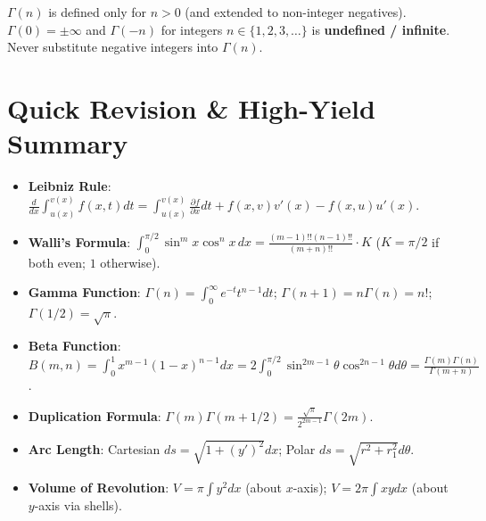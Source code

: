 \begin{commonmistake}
$\Gamma(n)$ is defined only for $n > 0$ (and extended to non-integer negatives). $\Gamma(0) = \pm\infty$ and $\Gamma(-n)$ for integers $n \in \{1, 2, 3, \dots\}$ is \textbf{undefined / infinite}. Never substitute negative integers into $\Gamma(n)$.
\end{commonmistake}

\section{Quick Revision \& High-Yield Summary}

\begin{quickrevision}
\begin{itemize}
    \item \textbf{Leibniz Rule}: $\frac{d}{dx}\int_{u(x)}^{v(x)} f(x,t)dt = \int_{u(x)}^{v(x)} \frac{\partial f}{\partial x}dt + f(x,v)v'(x) - f(x,u)u'(x)$.
    \item \textbf{Walli's Formula}: $\int_0^{\pi/2} \sin^m x \cos^n x\,dx = \frac{(m-1)!!(n-1)!!}{(m+n)!!} \cdot K$ ($K=\pi/2$ if both even; $1$ otherwise).
    \item \textbf{Gamma Function}: $\Gamma(n) = \int_0^\infty e^{-t} t^{n-1} dt$; $\Gamma(n+1)=n\Gamma(n)=n!$; $\Gamma(1/2)=\sqrt{\pi}$.
    \item \textbf{Beta Function}: $B(m,n) = \int_0^1 x^{m-1}(1-x)^{n-1}dx = 2\int_0^{\pi/2}\sin^{2m-1}\theta\cos^{2n-1}\theta d\theta = \frac{\Gamma(m)\Gamma(n)}{\Gamma(m+n)}$.
    \item \textbf{Duplication Formula}: $\Gamma(m)\Gamma(m+1/2) = \frac{\sqrt{\pi}}{2^{2m-1}}\Gamma(2m)$.
    \item \textbf{Arc Length}: Cartesian $ds = \sqrt{1+(y')^2}dx$; Polar $ds = \sqrt{r^2+r_1^2}d\theta$.
    \item \textbf{Volume of Revolution}: $V = \pi \int y^2 dx$ (about $x$-axis); $V = 2\pi \int xy dx$ (about $y$-axis via shells).
\end{itemize}
\end{quickrevision}

